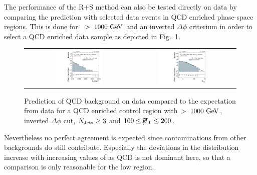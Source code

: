 The performance of the R+S method can also be tested directly on data by comparing the prediction with selected data events in QCD enriched phase-space regions. This is done for \HT~$>~1000~\rm{GeV}$ and an inverted $\Delta \phi$ criterium in order to select a QCD enriched data sample as depicted in Fig.~\ref{fig:qcd_rs_dataclosure}. 
\begin{figure}[!h]
  \centering
  \begin{tabular}{cc}
                \includegraphics[width=0.49\textwidth]{figures/HT_presel_HThigh_data_DR53X_chs_HThigh_invertedDeltaPhi_v1.pdf} &
                \includegraphics[width=0.49\textwidth]{figures/NJets_presel_HThigh_data_DR53X_chs_HThigh_invertedDeltaPhi_v1.pdf} \\
  \end{tabular}
  \caption{Prediction of QCD background on data compared to the expectation from data for a QCD enriched control region with \HT$>~1000~\rm{GeV}$, inverted $\Delta \phi$ cut, $N_{\text{Jets}} \geq 3$ and $100 \leq \slash\mkern-12mu{H}_{\text{T}} \leq 200$\gev.}
  \label{fig:qcd_rs_dataclosure}
\end{figure}
Nevertheless no perfect agreement is expected since contaminations from other backgrounds do still contribute. Especially the deviations in the \MHT distribution increase with increasing values of \MHT as QCD is not dominant here, so that a comparison is only reasonable for the low \MHT region. 


